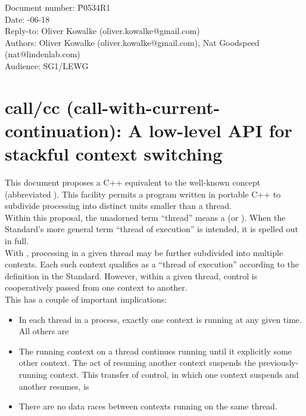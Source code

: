 \documentclass[fontsize=10pt,paper=A4,pagesize,DIV=15]{scrartcl}
\begin{document}
\small
\begin{tabbing}
    Document number: \= P0534R1\\
    Date:            -06-18\\
    Reply-to:        \> Oliver Kowalke (oliver.kowalke@gmail.com)\\
    Authors:         \> Oliver Kowalke (oliver.kowalke@gmail.com), Nat Goodspeed (nat@lindenlab.com)\\
    Audience:        \> SG1/LEWG\\
\end{tabbing}

\section*{call/cc (call-with-current-continuation): A low-level API for stackful context switching}


\tableofcontents


This document proposes a C++ equivalent to the well-known concept
 (abbreviated ). This
facility permits a program written in portable C++ to subdivide processing into
distinct  units smaller than a thread.\\

Within this proposal, the unadorned term ``thread'' means a 
(or ).
When the Standard's more general term ``thread of execution'' is intended, it
is spelled out in full.\\

With \cc, processing in a given thread may be further subdivided into multiple
contexts. Each such context qualifies as a ``thread of execution'' according
to the definition in the Standard. However, within a given thread, control is
cooperatively passed from one context to another.\\

This has a couple of important implications:

\begin{itemize}
\item In each thread in a process, exactly one context is running at any given
  time. All others are 
\item The running context on a thread continues running until it explicitly
   some other context. The act of resuming another context
  suspends the previously-running context. This transfer of control, in which
  one context suspends and another resumes, is 
\item There are no data races between contexts running on the same thread.
\end{itemize}
\end{document}
